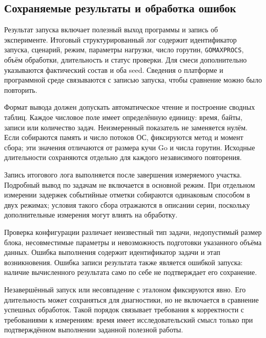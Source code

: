 
\subsection{Сохраняемые результаты и обработка ошибок}
\label{subsec:output-requirements}

Результат запуска включает полезный выход программы и запись об эксперименте. Итоговый
  структурированный лог содержит идентификатор запуска, сценарий, режим, параметры нагрузки,
  число горутин, \texttt{GOMAXPROCS}, объём обработки, длительность и статус проверки.
  Для смеси дополнительно указываются фактический состав и оба seed. Сведения о платформе
  и программной среде связываются с записью запуска, чтобы сравнение можно было повторить.

Формат вывода должен допускать автоматическое чтение и построение сводных таблиц.
  Каждое числовое поле имеет определённую единицу: время, байты, записи или количество задач.
  Неизмеренный показатель не заменяется нулём. Если собираются память и число потоков ОС,
  фиксируются метод и момент сбора; эти значения отличаются от размера кучи Go и числа горутин.
  Исходные длительности сохраняются отдельно для каждого независимого повторения.

Запись итогового лога выполняется после завершения измеряемого участка. Подробный вывод
  по задачам не включается в основной режим. При отдельном измерении задержек событийные
  отметки собираются одинаковым способом в двух режимах; условия такого сбора отражаются
  в описании серии, поскольку дополнительные измерения могут влиять на обработку.

Проверка конфигурации различает неизвестный тип задачи, недопустимый размер блока, несовместимые
  параметры и невозможность подготовки указанного объёма данных. Ошибка выполнения содержит
  идентификатор задачи и этап возникновения. Ошибка записи результата также является ошибкой
  запуска: наличие вычисленного результата само по себе не подтверждает его сохранение.

Незавершённый запуск или несовпадение с эталоном фиксируются явно. Его длительность может
  сохраняться для диагностики, но не включается в сравнение успешных обработок.
  Такой порядок связывает требования к корректности с требованиями к измерениям: время
  имеет исследовательский смысл только при подтверждённом выполнении заданной полезной работы.
